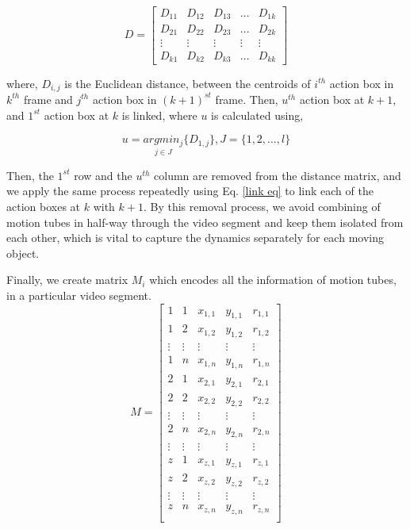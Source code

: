 \begin{equation}
D=\begin{bmatrix}
    D_{11}       & D_{12} & D_{13} & \dots & D_{1k} \\
    D_{21}       & D_{22} & D_{23} & \dots & D_{2k} \\
    \vdots       & \vdots & \vdots & \vdots & \vdots \\
    D_{k1}       & D_{k2} & D_{k3} & \dots & D_{kk}
\end{bmatrix}
\end{equation}


where, $D_{i,j}$ is the Euclidean distance, between the centroids of $i^{th}$ action box in $k^{th}$ frame and $j^{th}$ action box in $(k+1)^{st}$ frame.
Then, $u^{th}$ action box at $k+1$, and $1^{st}$ action box at $k$ is linked, where $u$ is calculated using,


\begin{equation}
u=\underset{j\in J}{argmin_j}\{D_{1,j}\}, J=\{1,2,\dots,l\}
\label{link eq}
\end{equation}

Then, the $1^{st}$ row and the $u^{th}$ column are removed from the distance matrix, and we apply the same process repeatedly using Eq. \ref{link eq}
to link each of the action boxes at $k$ with $k+1$. By this removal process, we avoid combining of motion tubes in half-way through
the video segment and keep them isolated from each other, which is vital to capture the dynamics separately for each moving object.




Finally, we create matrix $M_{i}$ which encodes all the information of motion tubes, in a particular video segment.
\begin{equation}
M=\begin{bmatrix}
    1       & 1 & x_{1,1} & y_{1,1} & r_{1,1} \\
    1       & 2 & x_{1,2} & y_{1,2} & r_{1,2} \\
    \vdots       & \vdots & \vdots & \vdots & \vdots \\
    1       & n & x_{1,n} & y_{1,n} & r_{1,n} \\
    2       & 1 & x_{2,1} & y_{2,1} & r_{2,1} \\
    2       & 2 & x_{2,2} & y_{2,2} & r_{2,2} \\
    \vdots       & \vdots & \vdots & \vdots & \vdots \\
    2       & n & x_{2,n} & y_{2,n} & r_{2,n} \\
    \vdots       & \vdots & \vdots & \vdots & \vdots \\
    z       & 1 & x_{z,1} & y_{z,1} & r_{z,1} \\
    z       & 2 & x_{z,2} & y_{z,2} & r_{z,2} \\
    \vdots       & \vdots & \vdots & \vdots & \vdots \\
    z       & n & x_{z,n} & y_{z,n} & r_{z,n} \\

\end{bmatrix}
\end{equation}

